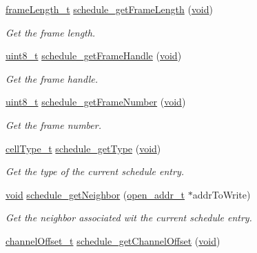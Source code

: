 \begin{DoxyCompactItemize}
\hyperlink{group___schedule_gab960413860c0b01b38ece025b0ee534d}{frame\+Length\+\_\+t} \hyperlink{group___schedule_gad9d1ef9965017c2923cb6905b7cc6b7f}{schedule\+\_\+get\+Frame\+Length} (\hyperlink{usb__devapi_8h_afabf60e7f57651d6d595a02c75f07cd0}{void})
\begin{DoxyCompactList}\small\item\em Get the frame length. \end{DoxyCompactList}\item 
\hyperlink{_p_e___types_8h_aba7bc1797add20fe3efdf37ced1182c5}{uint8\+\_\+t} \hyperlink{group___schedule_gab5f5f36f28daf8b9d66ca4bea15bfd15}{schedule\+\_\+get\+Frame\+Handle} (\hyperlink{usb__devapi_8h_afabf60e7f57651d6d595a02c75f07cd0}{void})
\begin{DoxyCompactList}\small\item\em Get the frame handle. \end{DoxyCompactList}\item 
\hyperlink{_p_e___types_8h_aba7bc1797add20fe3efdf37ced1182c5}{uint8\+\_\+t} \hyperlink{group___schedule_gafeced111ea698fa49d70a22d96ad3014}{schedule\+\_\+get\+Frame\+Number} (\hyperlink{usb__devapi_8h_afabf60e7f57651d6d595a02c75f07cd0}{void})
\begin{DoxyCompactList}\small\item\em Get the frame number. \end{DoxyCompactList}\item 
\hyperlink{group___schedule_gad8490d4fdf8cef27f7e5fa6a37046a3d}{cell\+Type\+\_\+t} \hyperlink{group___schedule_gafbc894e77f655a69eb9a76bd79f08bda}{schedule\+\_\+get\+Type} (\hyperlink{usb__devapi_8h_afabf60e7f57651d6d595a02c75f07cd0}{void})
\begin{DoxyCompactList}\small\item\em Get the type of the current schedule entry. \end{DoxyCompactList}\item 
\hyperlink{usb__devapi_8h_afabf60e7f57651d6d595a02c75f07cd0}{void} \hyperlink{group___schedule_ga6a1d0334cd9da212a38a1db05e291d3a}{schedule\+\_\+get\+Neighbor} (\hyperlink{structopen__addr__t}{open\+\_\+addr\+\_\+t} $\ast$addr\+To\+Write)
\begin{DoxyCompactList}\small\item\em Get the neighbor associated wit the current schedule entry. \end{DoxyCompactList}\item 
\hyperlink{group___schedule_gab53645758fe83985f0b35af7c5c2115e}{channel\+Offset\+\_\+t} \hyperlink{group___schedule_gac5b1f77de9164b82f73cdc76612e5e54}{schedule\+\_\+get\+Channel\+Offset} (\hyperlink{usb__devapi_8h_afabf60e7f57651d6d595a02c75f07cd0}{void})

\end{DoxyCompactItemize}
